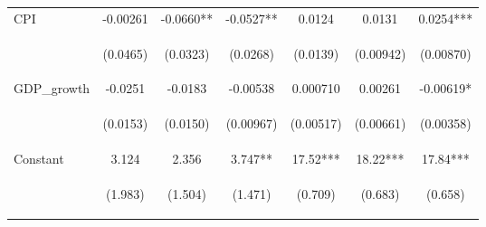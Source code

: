 \documentclass[]{article}
\begin{document}
\begin{center}
\begin{tabular}{lcccccc}
CPI & -0.00261 & -0.0660** & -0.0527** & 0.0124 & 0.0131 & 0.0254*** \\
\vspace{4pt} & \begin{footnotesize}(0.0465)\end{footnotesize} & \begin{footnotesize}(0.0323)\end{footnotesize} & \begin{footnotesize}(0.0268)\end{footnotesize} & \begin{footnotesize}(0.0139)\end{footnotesize} & \begin{footnotesize}(0.00942)\end{footnotesize} & \begin{footnotesize}(0.00870)\end{footnotesize} \\
GDP\_growth & -0.0251 & -0.0183 & -0.00538 & 0.000710 & 0.00261 & -0.00619* \\
\vspace{4pt} & \begin{footnotesize}(0.0153)\end{footnotesize} & \begin{footnotesize}(0.0150)\end{footnotesize} & \begin{footnotesize}(0.00967)\end{footnotesize} & \begin{footnotesize}(0.00517)\end{footnotesize} & \begin{footnotesize}(0.00661)\end{footnotesize} & \begin{footnotesize}(0.00358)\end{footnotesize} \\
Constant & 3.124 & 2.356 & 3.747** & 17.52*** & 18.22*** & 17.84*** \\
 & \begin{footnotesize}(1.983)\end{footnotesize} & \begin{footnotesize}(1.504)\end{footnotesize} & \begin{footnotesize}(1.471)\end{footnotesize} & \begin{footnotesize}(0.709)\end{footnotesize} & \begin{footnotesize}(0.683)\end{footnotesize} & \begin{footnotesize}(0.658)\end{footnotesize} \\

\end{tabular}
\end{center}
\end{document}
